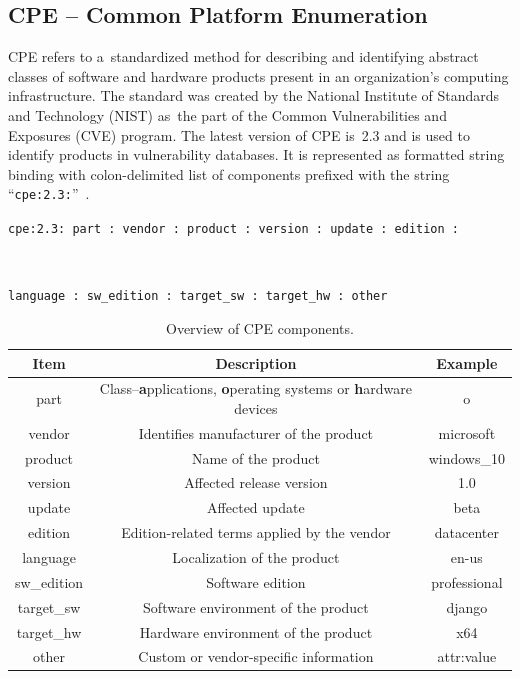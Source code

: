   \subsection*{CPE -- Common Platform Enumeration}
    CPE refers to a~standardized method for describing and identifying abstract classes of software
    and hardware products present in an organization's computing infrastructure. The standard was created
    by the National Institute of Standards and Technology (NIST) as~the part of the Common Vulnerabilities
    and Exposures (CVE) program. The latest version of CPE is~2.3 and is used to identify products
    in vulnerability databases. It is represented as formatted string binding with colon-delimited
    list of components prefixed with the string ``\texttt{cpe:2.3:}''~\cite{CPEnaming}.\\
      \centerline{\texttt{cpe:2.3: part : vendor : product : version : update : edition :}}\\
      \centerline{\texttt{language : sw\_edition : target\_sw : target\_hw : other}}
    \begin{table}[h]
        \centering
        \begin{tabular}{|c|c|c|}
          \hline
            Item & Description & Example \\
          \hline
            part & Class--\textbf{a}pplications, \textbf{o}perating systems or \textbf{h}ardware devices & o \\
            vendor & Identifies manufacturer of the product & microsoft \\
            product & Name of the product & windows\_10 \\
            version & Affected release version & 1.0 \\
            update & Affected update & beta \\
            edition & Edition-related terms applied by the vendor & datacenter \\
            language & Localization of the product & en-us \\
            sw\_edition & Software edition & professional \\
            target\_sw & Software environment of the product & django \\
            target\_hw & Hardware environment of the product & x64 \\
            other & Custom or vendor-specific information & attr:value\\
          \hline
        \end{tabular}
        \caption{Overview of CPE components.}
        \label{tab:my_label}
    \end{table}

